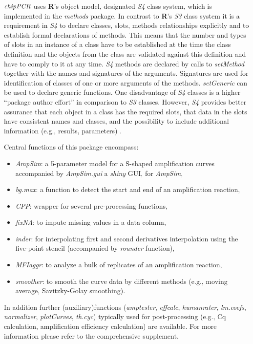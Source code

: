 \documentclass[twocolumn]{bmcart}%
\begin{document}
  $\emph{chipPCR}$ uses \textbf{R}’s object model, designated \emph{S4} class 
system, which is implemented in the \emph{methods} package. In contrast to 
\textbf{R}’s \emph{S3} class system it is a requirement in \emph{S4} to declare 
classes, slots, methods relationships explicitly and to establish formal 
declarations of methods. This means that the number and types of slots in an 
instance of a class have to be established at the time the class definition and 
the objects from the class are validated against this definition and have to 
comply to it at any time. \emph{S4} methods are declared by calls to 
\textsl{setMethod} together with the names and signatures of the arguments. 
Signatures are used for identification of classes of one or more arguments of 
the methods. \textsl{setGeneric} can be used to declare generic functions. One 
disadvantage of \emph{S4} classes is a higher ``package author effort'' in 
comparison to \emph{S3} classes. However, \emph{S4} provides better assurance 
that each object in a class has the required slots, that data in the slots have 
consistent names and classes, and the possibility to include additional 
information (e.g., results, parameters) \cite{Karatzoglou_2004}.

Central functions of this package encompass: 

\begin{itemize}
\item \textsl{AmpSim}: a 5-parameter model for a 
S-shaped amplification curves accompanied by \textsl{AmpSim.gui} a \emph{shiny} 
GUI, for \textsl{AmpSim},
\item \textsl{bg.max}: a function to detect the start and end of an 
amplification reaction,
\item \textsl{CPP}: wrapper for several pre-processing functions,
\item \textsl{fixNA}: to impute missing values in a data column,
\item \textsl{inder}: for interpolating first and second derivatives 
interpolation using the five-point stencil (accompanied by 
\textsl{rounder} function),
\item \textsl{MFIaggr}: to analyze a bulk of replicates of an amplification 
reaction, 
\item \textsl{smoother}: to smooth the curve data by different methods 
(e.g., moving average, Savitzky-Golay smoothing).
\end{itemize}

In addition further (auxiliary)functions (\textsl{amptester}, 
\textsl{effcalc}, \textsl{humanrater}, \textsl{lm.coefs}, \textsl{normalizer}, 
\textsl{plotCurves}, \textsl{th.cyc}) typically used for post-processing (e.g., 
Cq calculation, amplification efficiency calculation) are available. For more 
information please refer to the comprehensive supplement.
\end{document}
